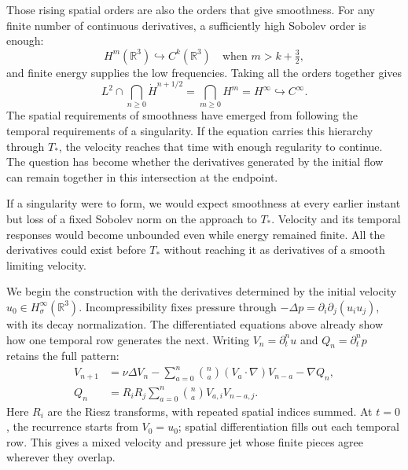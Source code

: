 Those rising spatial orders are also the orders that give smoothness.
For any finite number of continuous derivatives, a sufficiently high
Sobolev order is enough:
\[
 H^m(\mathbb R^3)\hookrightarrow C^k(\mathbb R^3)
 \quad\text{when }m>k+\tfrac32,
\]
and finite energy supplies the low frequencies. Taking all the orders
together gives
\[
 L^2\cap\bigcap_{n\ge0}\dot H^{n+1/2}
 =\bigcap_{m\ge0}H^m
 =H^\infty\hookrightarrow C^\infty.
\]
The spatial requirements of smoothness have emerged from following the
temporal requirements of a singularity. If the equation carries this hierarchy through
\(T_*\), the velocity reaches that time with enough regularity to continue.
The question has become whether the derivatives generated by the initial
flow can remain together in this intersection at the endpoint.

If a singularity were to form, we would expect smoothness at every earlier
instant but loss of a fixed Sobolev norm on the approach to \(T_*\).
Velocity and its temporal responses would become unbounded even while
energy remained finite. All the derivatives could exist before \(T_*\)
without reaching it as derivatives of a smooth limiting velocity.

We begin the construction with the derivatives determined by the initial
velocity \(u_0\in H^\infty_\sigma(\mathbb R^3)\). Incompressibility fixes
pressure through \(-\Delta p=\partial_i\partial_j(u_i u_j)\), with its
decay normalization. The differentiated equations above already show how
one temporal row generates the next. Writing
\(V_n=\partial_t^nu\) and \(Q_n=\partial_t^np\) retains the full pattern:
\[
 \begin{aligned}
 V_{n+1}&=\nu\Delta V_n
 -\sum_{a=0}^n\binom na(V_a\cdot\nabla)V_{n-a}-\nabla Q_n,\\
 Q_n&=R_iR_j\sum_{a=0}^n\binom na V_{a,i}V_{n-a,j}.
 \end{aligned}
\]
Here \(R_i\) are the Riesz transforms, with repeated spatial indices
summed. At \(t=0\), the recurrence starts from \(V_0=u_0\); spatial
differentiation fills out each temporal row. This gives a mixed velocity
and pressure jet whose finite pieces agree wherever they overlap.

